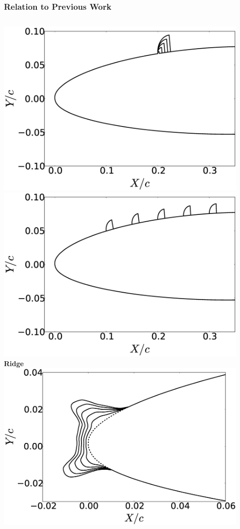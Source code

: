 \documentclass[9pt]{beamer}
\begin{document}
\begin{frame}
\frametitle{Relation to Previous Work}
\label{sec-1-3}


\begin{columns}[c]
    \centering
    \includegraphics[width=0.95\textwidth]{RidgeRVariation} \\
    \includegraphics[width=0.95\textwidth]{RidgeSVariation} \\
    {\bf Ridge}
    \centering
    \includegraphics[width=0.95\textwidth]{HornHVariation} \\

\end{columns}
\end{frame}
\end{document}
